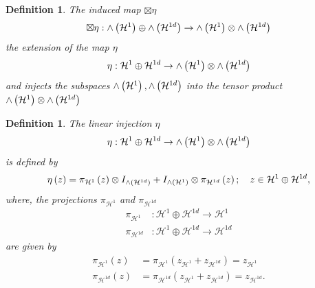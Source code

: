 \documentclass[aps,preprint]{revtex4}%
\newtheorem{definition}[theorem]{Definition}
\begin{document}
\begin{definition}
The induced map $\boxtimes\eta$
\begin{equation}
\boxtimes\eta:{\huge \wedge}\left(  \mathcal{H}^{1}\right)  \oplus
{\huge \wedge}\left(  \mathcal{H}^{1d}\right)  \rightarrow{\huge \wedge
}\left(  \mathcal{H}^{1}\right)  \otimes{\huge \wedge}\left(  \mathcal{H}%
^{1d}\right)
\end{equation}
the extension of the map $\eta$%
\begin{equation}
\eta:\mathcal{H}^{1}\oplus\mathcal{H}^{1d}\rightarrow{\huge \wedge}\left(
\mathcal{H}^{1}\right)  \otimes{\huge \wedge}\left(  \mathcal{H}^{1d}\right)
\end{equation}
and injects the subspaces ${\huge \wedge}\left(  \mathcal{H}^{1}\right)
,{\huge \wedge}\left(  \mathcal{H}^{1d}\right)  $ into the tensor product
${\huge \wedge}\left(  \mathcal{H}^{1}\right)  \otimes{\huge \wedge}\left(
\mathcal{H}^{1d}\right)  $ 
\end{definition}

\begin{definition}
The linear injection $\eta$
\begin{equation}
\eta:\mathcal{H}^{1}\oplus\mathcal{H}^{1d}\rightarrow{\huge \wedge}\left(
\mathcal{H}^{1}\right)  \otimes{\huge \wedge}\left(  \mathcal{H}^{1d}\right)
\end{equation}
is defined by
\begin{equation}
\eta\left(  z\right)  =\pi_{\mathcal{H}^{1}}\left(  z\right)  \otimes
I_{{\huge \wedge}\left(  \mathcal{H}^{1d}\right)  }+I_{{\huge \wedge}\left(
\mathcal{H}^{1}\right)  }\otimes\pi_{\mathcal{H}^{1d}}\left(  z\right)  ;\quad
z\in\mathcal{H}^{1}\oplus\mathcal{H}^{1d},
\end{equation}
where, the projections $\pi_{\mathcal{H}^{1}}$ and $\pi_{\mathcal{H}^{1d}}$
\begin{align}
\pi_{\mathcal{H}^{1}} &  :\mathcal{H}^{1}\oplus\mathcal{H}^{1d}\rightarrow
\mathcal{H}^{1}\\
\pi_{\mathcal{H}^{1d}} &  :\mathcal{H}^{1}\oplus\mathcal{H}^{1d}%
\rightarrow\mathcal{H}^{1d}%
\end{align}
are given by
\begin{align}
\pi_{\mathcal{H}^{1}}\left(  z\right)   &  =\pi_{\mathcal{H}^{1}}\left(
z_{\mathcal{H}^{1}}+z_{\mathcal{H}^{1d}}\right)  =z_{\mathcal{H}^{1}}\\
\pi_{\mathcal{H}^{1d}}\left(  z\right)   &  =\pi_{\mathcal{H}^{1d}}\left(
z_{\mathcal{H}^{1}}+z_{\mathcal{H}^{1d}}\right)  =z_{\mathcal{H}^{1d}}.
\end{align}

\end{definition}
\end{document}

